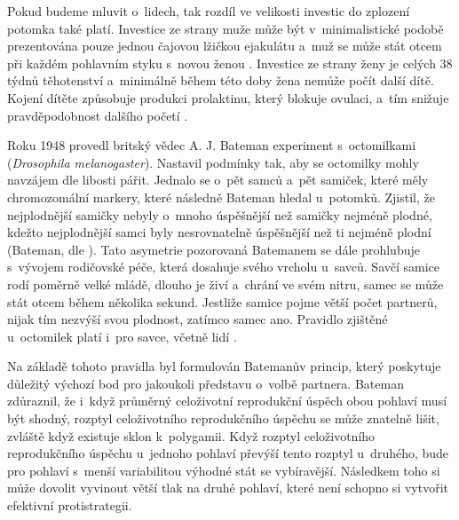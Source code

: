 \documentclass[a4paper, 12pt, notitlepage, oneside, numbers=noenddot]{report}
\begin{document}
Pokud budeme mluvit o~lidech, tak rozdíl ve velikosti investic do
zplození potomka také platí.  Investice ze strany muže může být
v~minimalistické podobě prezentována pouze jednou čajovou lžičkou
ejakulátu a~muž se může stát otcem při každém pohlavním styku s~novou
ženou \citep{Buss2007}.  Investice ze strany ženy je celých 38 týdnů
těhotenství a~minimálně během této doby žena nemůže počít další dítě.
Kojení dítěte způsobuje produkci prolaktinu, který blokuje ovulaci,
a~tím snižuje pravděpodobnost dalšího početí \citep{Kovar2005}.

Roku 1948 provedl britský vědec A. J. Bateman experiment s~octomilkami
(\textit{Drosophila melanogaster}).  Nastavil podmínky tak, aby se
octomilky mohly navzájem dle libosti pářit.  Jednalo se o~pět samců
a~pět samiček, které měly chromozomální markery, které následně
Bateman hledal u~potomků.  Zjistil, že nejplodnější samičky nebyly
o~mnoho úspěšnější než samičky nejméně plodné, kdežto nejplodnější
samci byly nesrovnatelně úspěšnější než ti nejméně plodní (Bateman,
dle \citealp{Ridley2007,Trivers1972}).  Tato asymetrie pozorovaná
Batemanem se dále prohlubuje s~vývojem rodičovské péče, která dosahuje
svého vrcholu u~savců.  Savčí samice rodí poměrně velké mládě, dlouho
je živí a~chrání ve svém nitru, samec se může stát otcem během
několika sekund.  Jestliže samice pojme větší počet partnerů, nijak
tím nezvýší svou plodnost, zatímco samec ano.  Pravidlo zjištěné
u~octomilek platí i~pro savce, včetně lidí \citet{Ridley2007,Buss2007}.

Na základě tohoto pravidla byl formulován Batemanův princip, který
poskytuje dů\-le\-ži\-tý výchozí bod pro jakoukoli představu o~volbě
partnera.  Bateman \citep{BarrettDunbarLycett2007} zdůraznil, že
i~když průměrný celoživotní reprodukční úspěch obou pohlaví musí být
shodný, rozptyl celoživotního reprodukčního úspěchu se může znatelně
lišit, zvláště když existuje sklon k~polygamii.  Když rozptyl
celoživotního reprodukčního úspěchu u~jednoho pohlaví převýší tento
rozptyl u~druhého, bude pro pohlaví s~menší variabilitou výhodné stát
se vybíravější.  Následkem toho si může dovolit vyvinout větší tlak na
druhé pohlaví, které není schopno si vytvořit efektivní
protistrategii.
\end{document}
